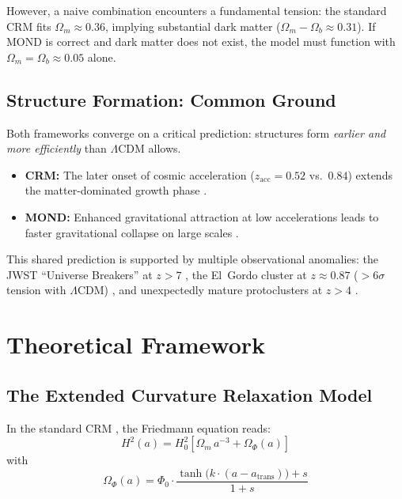 \documentclass[aps,prd,twocolumn,superscriptaddress,nofootinbib,floatfix]{revtex4-2}
\begin{document}
However, a naive combination encounters a fundamental tension: the standard CRM fits $\Omega_m \approx 0.36$, implying substantial dark matter ($\Omega_m - \Omega_b \approx 0.31$). If MOND is correct and dark matter does not exist, the model must function with $\Omega_m = \Omega_b \approx 0.05$ alone.

\subsection{Structure Formation: Common Ground}

Both frameworks converge on a critical prediction: structures form \textit{earlier and more efficiently} than $\Lambda$CDM allows.

\begin{itemize}
\item \textbf{CRM:} The later onset of cosmic acceleration ($z_{\mathrm{acc}} = 0.52$ vs.\ $0.84$) extends the matter-dominated growth phase \cite{Geiger2026}.
\item \textbf{MOND:} Enhanced gravitational attraction at low accelerations leads to faster gravitational collapse on large scales \cite{Asencio2023}.
\end{itemize}

This shared prediction is supported by multiple observational anomalies: the JWST ``Universe Breakers'' at $z > 7$ \cite{Labbe2023, BoylanKolchin2023}, the El~Gordo cluster at $z \approx 0.87$ (${>}6\sigma$ tension with $\Lambda$CDM) \cite{Asencio2023}, and unexpectedly mature protoclusters at $z > 4$ \cite{Miller2018}.


\section{Theoretical Framework}
\label{sec:theory}

\subsection{The Extended Curvature Relaxation Model}

In the standard CRM \cite{Geiger2026}, the Friedmann equation reads:
\begin{equation}
H^2(a) = H_0^2 \left[\Omega_m\,a^{-3} + \Omega_\Phi(a)\right]
\end{equation}
with
\begin{equation}
\Omega_\Phi(a) = \Phi_0 \cdot \frac{\tanh\!\big(k\cdot(a - a_{\mathrm{trans}})\big) + s}{1 + s}
\end{equation}
\end{document}
